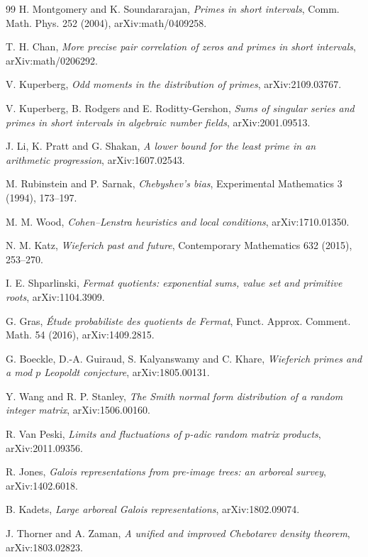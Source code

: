 \documentclass[11pt]{article}
\begin{document}
\begin{thebibliography}{99}
 H. Montgomery and K. Soundararajan,
\emph{Primes in short intervals}, Comm. Math. Phys. 252 (2004), arXiv:math/0409258.

 T. H. Chan,
\emph{More precise pair correlation of zeros and primes in short intervals},
arXiv:math/0206292.

 V. Kuperberg,
\emph{Odd moments in the distribution of primes}, arXiv:2109.03767.

 V. Kuperberg, B. Rodgers and E. Roditty-Gershon,
\emph{Sums of singular series and primes in short intervals in algebraic number fields},
arXiv:2001.09513.

 J. Li, K. Pratt and G. Shakan,
\emph{A lower bound for the least prime in an arithmetic progression}, arXiv:1607.02543.

 M. Rubinstein and P. Sarnak,
\emph{Chebyshev's bias}, Experimental Mathematics 3 (1994), 173--197.

 M. M. Wood,
\emph{Cohen--Lenstra heuristics and local conditions}, arXiv:1710.01350.

 N. M. Katz,
\emph{Wieferich past and future}, Contemporary Mathematics 632 (2015), 253--270.

 I. E. Shparlinski,
\emph{Fermat quotients: exponential sums, value set and primitive roots},
arXiv:1104.3909.

 G. Gras,
\emph{\'Etude probabiliste des quotients de Fermat},
Funct. Approx. Comment. Math. 54 (2016), arXiv:1409.2815.

 G. Boeckle, D.-A. Guiraud, S. Kalyanswamy and C. Khare,
\emph{Wieferich primes and a mod $p$ Leopoldt conjecture}, arXiv:1805.00131.

 Y. Wang and R. P. Stanley,
\emph{The Smith normal form distribution of a random integer matrix}, arXiv:1506.00160.

 R. Van Peski,
\emph{Limits and fluctuations of $p$-adic random matrix products}, arXiv:2011.09356.

 R. Jones,
\emph{Galois representations from pre-image trees: an arboreal survey},
arXiv:1402.6018.

 B. Kadets,
\emph{Large arboreal Galois representations}, arXiv:1802.09074.

 J. Thorner and A. Zaman,
\emph{A unified and improved Chebotarev density theorem}, arXiv:1803.02823.


\end{thebibliography}
\end{document}
